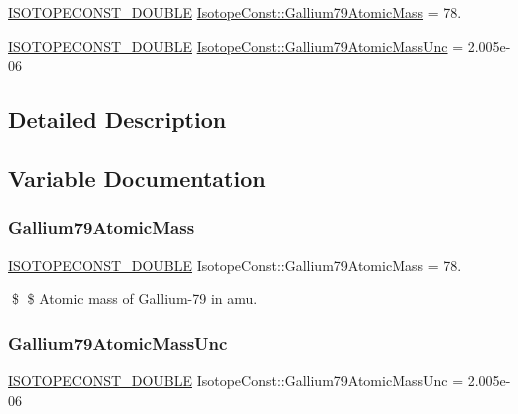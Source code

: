 \begin{DoxyCompactItemize}
\item 
\mbox{\hyperlink{group___isotope_const-_macros_ga8f45a7272ce02c0b4c65c44636ed719a}{I\+S\+O\+T\+O\+P\+E\+C\+O\+N\+S\+T\+\_\+\+D\+O\+U\+B\+LE}} \mbox{\hyperlink{group___isotope_const-_gallium-_ga79_ga04fc83cc16974a5c76152985fb5711c7}{Isotope\+Const\+::\+Gallium79\+Atomic\+Mass}} = 78.
\item 
\mbox{\hyperlink{group___isotope_const-_macros_ga8f45a7272ce02c0b4c65c44636ed719a}{I\+S\+O\+T\+O\+P\+E\+C\+O\+N\+S\+T\+\_\+\+D\+O\+U\+B\+LE}} \mbox{\hyperlink{group___isotope_const-_gallium-_ga79_ga4b07e64286af73881f174462cdf38571}{Isotope\+Const\+::\+Gallium79\+Atomic\+Mass\+Unc}} = 2.\+005e-\/06
\end{DoxyCompactItemize}


\subsection{Detailed Description}


\subsection{Variable Documentation}
\mbox{\label{group___isotope_const-_gallium-_ga79_ga04fc83cc16974a5c76152985fb5711c7}} 
\subsubsection{\texorpdfstring{Gallium79\+Atomic\+Mass}{Gallium79AtomicMass}}
{\footnotesize\ttfamily \mbox{\hyperlink{group___isotope_const-_macros_ga8f45a7272ce02c0b4c65c44636ed719a}{I\+S\+O\+T\+O\+P\+E\+C\+O\+N\+S\+T\+\_\+\+D\+O\+U\+B\+LE}} Isotope\+Const\+::\+Gallium79\+Atomic\+Mass = 78.}

\$ \$ Atomic mass of Gallium-\/79 in amu. \mbox{\label{group___isotope_const-_gallium-_ga79_ga4b07e64286af73881f174462cdf38571}} 
\subsubsection{\texorpdfstring{Gallium79\+Atomic\+Mass\+Unc}{Gallium79AtomicMassUnc}}
{\footnotesize\ttfamily \mbox{\hyperlink{group___isotope_const-_macros_ga8f45a7272ce02c0b4c65c44636ed719a}{I\+S\+O\+T\+O\+P\+E\+C\+O\+N\+S\+T\+\_\+\+D\+O\+U\+B\+LE}} Isotope\+Const\+::\+Gallium79\+Atomic\+Mass\+Unc = 2.\+005e-\/06}

